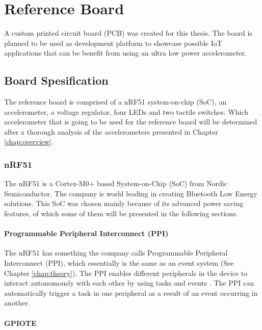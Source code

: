 \chapter{Reference Board}
\label{chap:reference}

A custom printed circuit board (PCB) was created for this thesis. The board is planned to be used as development platform to showcase possible IoT applications that can be benefit from using an ultra low power accelerometer. 

\section{Board Spesification}

The reference board is comprised of a nRF51 system-on-chip (SoC), an accelerometer, a voltage regulator, four LEDs and two tactile switches. Which accelerometer that is going to be used for the reference board will be determined after a thorough analysis of the accelerometers presented in Chapter \ref{chap:overview}.


\subsection{nRF51}

The nRF51 is a Cortex-M0+ based System-on-Chip (SoC) from Nordic Semiconductor. The company is world leading in creating Bluetooth Low Energy solutions. This SoC was chosen mainly because of its advanced power saving features, of which some of them will be presented in the following sections. 

\subsubsection{Programmable Peripheral Interconnect (PPI)}

The nRF51 has something the company calls Programmable Peripheral Interconnect (PPI), which essentially is the same as an event system (See Chapter \ref{chap:theory}). The PPI enables different peripherals in the device to interact autonomously with each other by using tasks and events \cite[~p.26]{nrf51}. The PPI can automatically trigger a task in one peripheral as a result of an event occurring in another. 

\subsubsection{GPIOTE}

